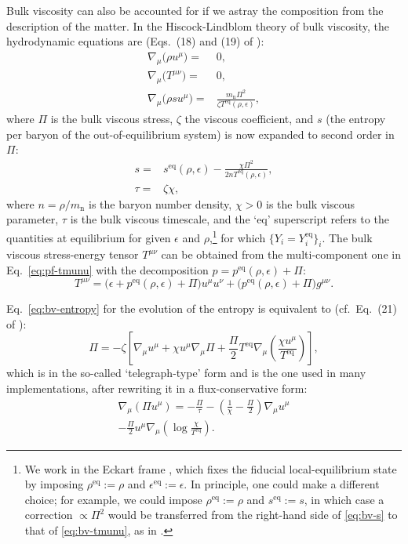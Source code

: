 \documentclass[aps,prd,twocolumn,a4paper,floatfix,nofootbib,superscriptaddress,nofootinbib]{revtex4}
\newcommand{\rn}{\mathrm{n}}
\newcommand{\req}{\mathrm{eq}}
\begin{document}
Bulk viscosity can also be accounted for if we astray the composition from the
description of the matter.  In the Hiscock-Lindblom theory of bulk viscosity,
the hydrodynamic equations are (Eqs.~(18) and (19) of \citet{Hiscock1983}):
%
\begin{align}
\label{eq:bv-continuity}
\nabla_\mu \big( \rho u^\mu \big) ={}&0,\\
\label{eq:bv-conservation}
\nabla_\mu\big( T^{\mu \nu}\big)={}&0,\\
\label{eq:bv-entropy}
\nabla_\mu\big(\rho s u^\mu\big)={}&\frac{m_\rn\Pi^2}{\zeta T^\req(\rho,\epsilon)},
\end{align}
%
where $\Pi$ is the bulk viscous stress, $\zeta$ the viscous coefficient, and
$s$ (the entropy per baryon of the out-of-equilibrium system) is now expanded to second order in~$\Pi$:
%
\begin{align}
\label{eq:bv-s}
s={}&s^\req(\rho,\epsilon) - \frac{\chi\Pi^2}{2nT^\req(\rho,\epsilon)},\\
\label{eq:bv-tau}
\tau={}&\zeta\chi,
\end{align}
%
where $n=\rho/m_\rn$ is the baryon number density, $\chi>0$ is the bulk viscous
parameter, $\tau$ is the bulk viscous timescale, and the `eq' superscript
refers to the quantities at equilibrium for given $\epsilon$ and
$\rho$,\footnote{\label{fnt:1} We work in the Eckart frame \cite{Kovtun19},
which fixes the fiducial local-equilibrium state by imposing $\rho^\req:=\rho$
and $\epsilon^\req:=\epsilon$. In principle, one could make a different choice;
for example, we could impose $\rho^\req:=\rho$ and $s^\req:=s$, in which case
a correction $\propto \Pi^2$ would be transferred from the right-hand side of
\eqref{eq:bv-s} to that of \eqref{eq:bv-tmunu}, as in \citet{Gavassino21bulk}. }
for which $\{Y_i=Y_i^\req\}_i$.
%
The bulk viscous stress-energy tensor $T^{\mu\nu}$ can be obtained from the
multi-component one in Eq.~\eqref{eq:pf-tmunu} with the decomposition $p= p^\mathrm{eq}(\rho,\epsilon) + \Pi$:
\begin{equation}
\label{eq:bv-tmunu}
T^{\mu\nu}=\big(\epsilon + p^\req(\rho,\epsilon) + \Pi\big)u^\mu u^\nu
+ \big(p^\req(\rho,\epsilon) + \Pi\big)g^{\mu\nu}.
\end{equation}

Eq.~\eqref{eq:bv-entropy} for the evolution of the entropy is
equivalent to (cf.~Eq.~(21) of \citet{Hiscock1983}):
%
\begin{equation}
\label{eq:telegraph-bulk}
\Pi=-\zeta\left[\nabla_\mu u^\mu +
\chi u^\mu\nabla_\mu\Pi+\frac\Pi2 T^\req\nabla_\mu\left(\frac{\chi
u^\mu}{T^\req}\right)\right],
\end{equation}
%
which is in the so-called `telegraph-type' form and is the one used in many
implementations, after rewriting it in a flux-conservative form:
%
\begin{multline}
\label{eq:hiscock-lindblom}
\nabla_\mu(\Pi u^\mu)=-\frac\Pi\tau -\left(\frac1\chi-\frac\Pi2\right)\nabla_\mu u^\mu\\
-\frac\Pi2 u^\mu\nabla_\mu\left(\log\frac{\chi}{T^\req}\right).
\end{multline}
\end{document}

